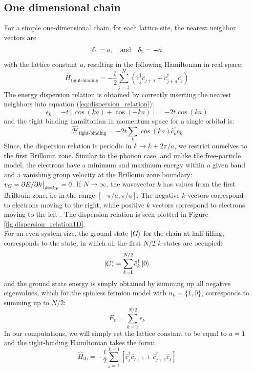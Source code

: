 \documentclass[11pt, a4paper, oneside]{book}
\theoremstyle{definition} %
\begin{document}
\subsection{One dimensional chain}
For a simple one-dimensional chain, for each lattice site,  the nearest neighbor vectors are \cite{Utermohlen}
\begin{equation}
	\delta_1 = a, \qq{and} \delta_2 = -a
\end{equation}
with the lattice constant $a$, resulting in the following Hamiltonian in real space:
\begin{equation}
	\hat{H}_{\text{tight-binding}} = -\frac{t}{2}\sum_{j=1}^N(\hat{c}_j^\dagger \hat{c}_{j + a} + \hat{c}_{j + a}^\dagger \hat{c}_j)
\end{equation}
The energy dispersion relation is obtained by correctly inserting the nearest neighbors into equation (\ref{eq:dispersion_relation}):
\begin{equation}
	\epsilon_k = -t \left[ \cos(ka) + \cos(-ka)\right] = -2t\cos(ka)
\end{equation}
and the tight binding hamiltonian in momentum space for a single orbital is:
\begin{equation}
	\hat{\mathcal{H}}_{\text{tight-binding}} = -2t \sum_{k} \cos(ka) \hat{c}_{k}^\dagger \hat{c}_{k}
\end{equation}
Since, the dispersion relation is periodic in $k \rightarrow k + 2\pi/a$, we restrict ourselves to the first Brillouin zone. Similar to the phonon case, and unlike the free-particle model, the electrons have a minimum and maximum energy within a given band and a vanishing group velocity at the Brillouin zone boundary: $v_G  = \partial{E}/\partial{k}\eval_{k = k_F} = 0$. If $N \rightarrow \infty$, the wavevector $k$ has values from the first Brillouin zone, i.e in the range $[-\pi/a, \pi/a]$. The negative $k$ vectors correspond to electrons moving to the right, while positive $k$ vectors correspond to electrons moving to the left  \cite{Simon}\cite{Singleton}. The dispersion relation is seen plotted in Figure \ref{fig:dispersion_relation1D}.\\

For an even system size, the ground state $\ket{G}$ for the chain at half filling, corresponds to the state, in which all the first $N/2$ $k$-states are occupied:
\begin{equation}
	\ket{G} = \sum_{k = 1}^{N/2} \hat{c}_k^\dagger\ket{0}
\end{equation}
and the ground state energy is simply obtained by summing up all negative eigenvalues, which for the spinless fermion model with $n_k = \{1,0\}$, corresponds to summing up to $N/2$:
\begin{equation}
	E_0 = \sum_{k=1}^{N/2} \epsilon_{k}
\end{equation}
In our computations, we will simply set the lattice constant to be equal to $a=1$ and the tight-binding Hamiltonian takes the form:
\begin{equation}
	\hat{H}_{\text{tb}} = - \frac{t}{2} \sum_{j=1}^{L-1}[\hat{c}_j^\dagger \hat{c}_{j+1} + \hat{c}_{j + 1}^\dagger \hat{c}_j]
\end{equation}
\end{document}
